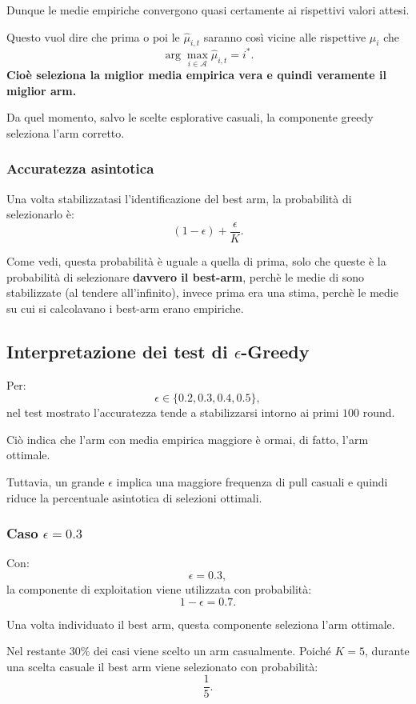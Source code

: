 Dunque le medie empiriche convergono quasi certamente ai rispettivi valori attesi.

Questo vuol dire che prima o poi le $\hat{\mu}_{i,t}$ saranno così vicine alle rispettive $\mu_i$ che 
\[
\arg\max_{i\in\mathcal{A}}
\widehat{\mu}_{i,t}
=
i^*.
\]
\textbf{Cioè seleziona la miglior media empirica vera e quindi veramente il miglior arm.}

Da quel momento, salvo le scelte esplorative casuali, la componente greedy seleziona l'arm corretto.

\subsubsection{Accuratezza asintotica}

Una volta stabilizzatasi l'identificazione del best arm, la probabilità di selezionarlo è:
\[
(1-\epsilon)+\frac{\epsilon}{K}.
\]

Come vedi, questa probabilità è uguale a quella di prima, solo che queste è la probabilità di selezionare \textbf{davvero il best-arm}, perchè le medie di sono stabilizzate (al tendere all'infinito), invece prima era una stima,
perchè le medie su cui si calcolavano i best-arm erano empiriche.

\subsection{Interpretazione dei test di $\epsilon$-Greedy}

Per:
\[
\epsilon\in\{0.2,0.3,0.4,0.5\},
\]
nel test mostrato l'accuratezza tende a stabilizzarsi intorno ai primi $100$ round.

Ciò indica che l'arm con media empirica maggiore è ormai, di fatto, l'arm ottimale.

Tuttavia, un grande $\epsilon$ implica una maggiore frequenza di pull casuali e quindi riduce la percentuale asintotica di selezioni ottimali.

\subsubsection{Caso $\epsilon=0.3$}

Con:
\[
\epsilon=0.3,
\]
la componente di exploitation viene utilizzata con probabilità:
\[
1-\epsilon=0.7.
\]

Una volta individuato il best arm, questa componente seleziona l'arm ottimale.

Nel restante $30\%$ dei casi viene scelto un arm casualmente. Poiché $K=5$, durante una scelta casuale il best arm viene selezionato con probabilità:
\[
\frac{1}{5}.
\]

